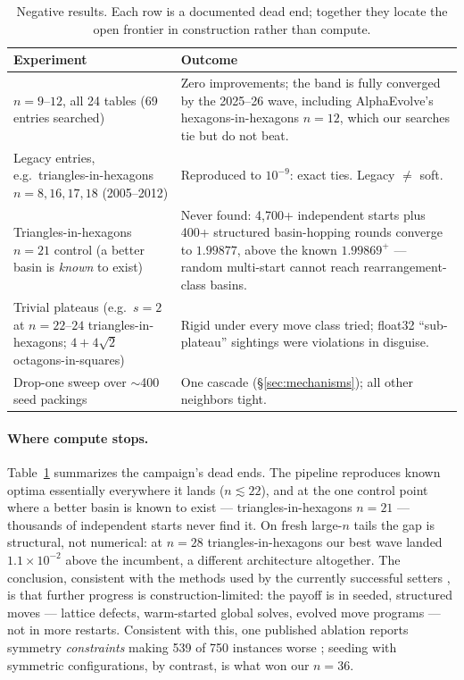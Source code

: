 \documentclass[11pt]{article}
\newcommand{\s}{\ensuremath{s}}
\begin{document}
\begin{table}[t]
\centering\small
\caption{Negative results. Each row is a documented dead end; together they
locate the open frontier in construction rather than compute.}
\label{tab:negative}
\begin{tabular}{p{}p{}}
\toprule
Experiment & Outcome \\
\midrule
$n=9$--$12$, all 24 tables (69 entries searched) & Zero improvements; the band
is fully converged by the 2025--26 wave, including AlphaEvolve's
hexagons-in-hexagons $n=12$, which our searches tie but do not beat. \\
Legacy entries, e.g.\ triangles-in-hexagons $n=8,16,17,18$ (2005--2012) &
Reproduced to $10^{-9}$: exact ties. Legacy $\ne$ soft. \\
Triangles-in-hexagons $n=21$ control (a better basin is \emph{known} to exist)
& Never found: 4,700+ independent starts plus 400+ structured basin-hopping
rounds converge to $1.99877$, above the known $1.99869^{+}$ --- random
multi-start cannot reach rearrangement-class basins. \\
Trivial plateaus (e.g.\ $\s=2$ at $n=22$--$24$ triangles-in-hexagons;
$4+4\sqrt{2}$ octagons-in-squares) & Rigid under every move class tried;
float32 ``sub-plateau'' sightings were violations in disguise. \\
Drop-one sweep over $\sim$400 seed packings & One cascade
(\S\ref{sec:mechanisms}); all other neighbors tight. \\
\bottomrule
\end{tabular}
\end{table}

\paragraph{Where compute stops.}
Table~\ref{tab:negative} summarizes the campaign's dead ends. The pipeline
reproduces known optima essentially everywhere it lands ($n\lesssim22$), and at
the one control point where a better basin is known to exist ---
triangles-in-hexagons $n=21$ --- thousands of independent starts never find it.
On fresh large-$n$ tails the gap is structural, not numerical: at $n=28$
triangles-in-hexagons our best wave landed $1.1\times10^{-2}$ above the
incumbent, a different architecture altogether. The conclusion, consistent
with the methods used by the currently successful setters
\cite{alphaevolve,berthold-oob,improvevolve}, is that further progress is
construction-limited: the payoff is in seeded, structured moves --- lattice
defects, warm-started global solves, evolved move programs --- not in more
restarts. Consistent with this, one published ablation reports symmetry
\emph{constraints} making 539 of 750 instances worse \cite{berthold-oob};
seeding with symmetric configurations, by contrast, is what won our $n=36$.
\end{document}
